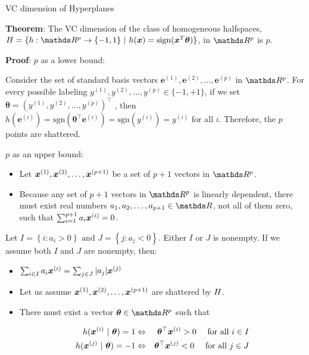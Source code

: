 \begin{vbframe}{VC dimension of Hyperplanes}
\framebreak

\textbf{Theorem}: The VC dimension of the class of homogeneous halfspaces, $\Hspace = \{h: \R^p \to \{-1, 1\} \text{ | } h(\xv) =  \sign (\xv^T\bm{\theta})\}$, in $\R^p$ is $p$.

\lz

\textbf{Proof}: $p$ as a lower bound: 

Consider the set of standard basis vectors $\mathbf{e}^{(1)},\mathbf{e}^{(2)},\ldots,\mathbf{e}^{(p)}$ in $\R^p$. For every possible labeling $y^{(1)},y^{(2)},\ldots, y^{(p)} \in \{-1,+1\}$, if we set $\bm{\theta} = (y^{(1)},y^{(2)},\ldots, y^{(p)})^\top$ , then $h(\mathbf{e}^{(i)}) = \text{sgn}\left(\bm{\theta}^\top \mathbf{e}^{(i)}\right) = \text{sgn}\left(y^{(i)}\right) = y^{(i)}$ for all $i$. Therefore, the $p$ points are shattered.

\lz

$p$ as an upper bound: 
\begin{itemize}
  \item Let $\bm{x}^{(1)},\bm{x}^{(2)},\ldots,\bm{x}^{(p+1)}$ be a set of $p+1$ vectors in $\R^p$.
  \item Because any set of $p+1$ vectors in $\R^p$ is linearly dependent, there must exist real numbers $a_1,a_2, \ldots,a_{p+1} \in \R$, not all of them zero, such that $\sum_{i=1}^{p+1} a_i\bm{x}^{(i)} = 0$.
\end{itemize}

Let $I=\left\{i: a_{i}>0\right\} \text { and } J=\left\{j: a_{j}<0\right\}$. Either $I$ or $J$ is nonempty. If we assume both $I$ and $J$ are nonempty, then:
\begin{itemize}
  \item $\sum_{i \in I} a_i \bm{x}^{(i)} = \sum_{j \in J} |a_j| \bm{x}^{(j)}$
  \item Let us assume $\bm{x}^{(1)},\bm{x}^{(2)},\ldots,\bm{x}^{(p + 1)}$ are shattered by $H$.
  \item There must exist a vector $\bm{\theta}\in \R^p$ such that 

  \begin{eqnarray*}
    h(\bm{x}^{(i)}~|~\bm{\theta}) = 1 &\Leftrightarrow& \bm{\theta}^\top \bm{x}^{(i)} > 0 \quad \text{ for all } i \in I \\
    h(\bm{x}^{(j)}~|~\bm{\theta}) = - 1 &\Leftrightarrow& \bm{\theta}^\top \bm{x}^{(j)} < 0 \quad \text{ for all } j \in J
  \end{eqnarray*}
  
  

\end{itemize}
\end{vbframe}
